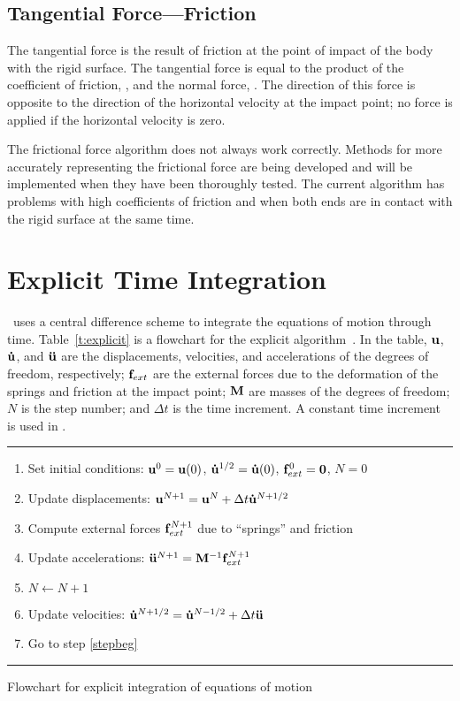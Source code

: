 \subsection{Tangential Force---Friction}

The tangential force is the result of friction at the point of impact of
the body with the rigid surface.  The tangential force is equal to the
product of the coefficient of friction, , and the normal force,
.  The direction of this force is opposite to the direction of
the horizontal velocity at the impact point; no force is applied if the
horizontal velocity is zero.   

The frictional force algorithm does not always work correctly.  Methods
for more accurately representing the frictional force are being
developed and will be implemented when they have been thoroughly tested. 
The current algorithm has problems with high coefficients of friction
and when both ends are in contact with the rigid surface at the same
time. 

\section{Explicit Time Integration}
\SLAP\ uses a central difference scheme to integrate the equations of
motion through time.  Table~\ref{t:explicit} is a flowchart for the
explicit algorithm~\cite{Belyt}.  In the table, ${\bf u}$, ${\bf \dot u}$, and
${\bf \ddot u}$ are the displacements, velocities, and accelerations of the
degrees of freedom, respectively; ${\bf f}_{ext}$ are the external forces due to
the deformation of the springs and friction at the impact point; ${\bf
M}$ are masses of the degrees of freedom; $N$ is the step number; and
$\Delta t$ is the time increment.  A constant time increment is used in
\SLAP. 

\begin{table}[ht]
\begingroup\itemsep 0pt
\hrule
\begin{enumerate}
\item Set initial conditions: ${\bf u}^0 = {\bf u}(0)$, ${\bf \dot u}^{1/2}
= {\bf \dot u}(0)$, ${\bf f}_{ext}^0 = {\bf 0}$, $N=0$
\item\label{stepbeg} Update displacements: ${\bf u}^{N+1} = {\bf u}^N + \Delta
t{\bf \dot u}^{N+1/2}$ 
\item Compute external forces ${\bf f}_{ext}^{N+1}$ due to ``springs'' and
friction
\item Update accelerations: ${\bf \ddot u}^{N+1} = {\bf M}^{-1} {\bf f}_{ext}^{N+1}$
\item $N \leftarrow N+1$
\item Update velocities: ${\bf \dot u}^{N+1/2} = {\bf \dot u}^{N-1/2} + \Delta t{\bf \ddot u}$
\item Go to step \ref{stepbeg}
\end{enumerate}
\hrule
\endgroup
\caption{Flowchart for explicit integration of equations of
motion}\label{t:explicit}
\end{table}

